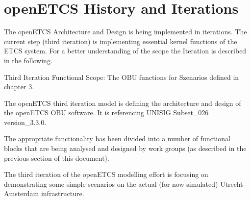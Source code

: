 \section{openETCS History and Iterations}
The openETCS Architecture and Design is being implemented in iterations. The current step (third iteration) is implementing essential kernel functions of the ETCS system. 
For a better understanding of the scope the Iteration is described in the following.

Third Iteration Functional Scope: The OBU functions for Szenarios defined in chapter 3.

The openETCS third iteration model is defining the architecture and design of the openETCS OBU software. 
It is referencing  \cite{subset-026} UNISIG Subset\_026 version\_3.3.0. 

The appropriate functionality has been divided into a number of functional blocks that are being analysed and designed by work groups (as described in the previous section of this document).

The third iteration of the openETCS modelling effort is focusing on demonstrating some simple scenarios on the actual (for now simulated) Utrecht- Amsterdam infrastructure.
